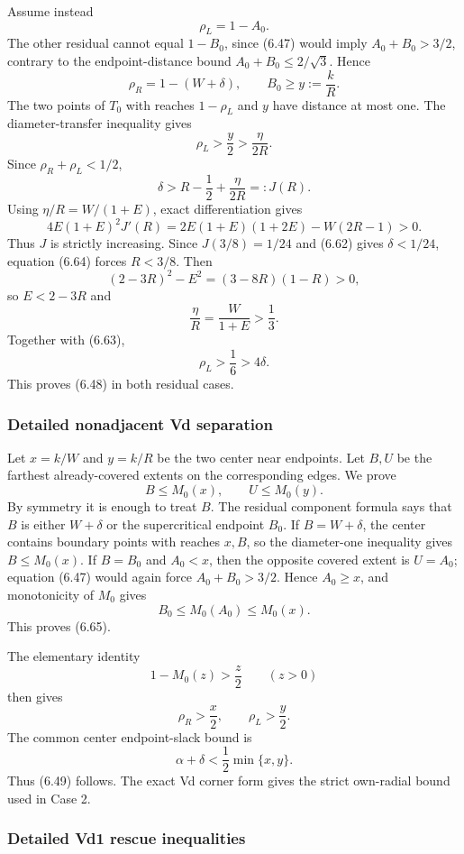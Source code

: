Assume instead
\[
 \rho_L=1-A_0.
\]
The other residual cannot equal $1-B_0$, since (6.47) would imply
$A_0+B_0>3/2$, contrary to the endpoint-distance bound
$A_0+B_0\le2/\sqrt3$.  Hence
\[
 \rho_R=1-(W+\delta),
 \qquad
 B_0\ge y:=\frac{k}{R}.
\]
The two points of $T_0$ with reaches $1-\rho_L$ and $y$ have distance at most
one.  The diameter-transfer inequality gives
\[
 \rho_L>\frac y2>\frac{\eta}{2R}.
 \tag{6.63}
\]
Since $\rho_R+\rho_L<1/2$,
\[
 \delta>R-\frac12+\frac{\eta}{2R}=:J(R).
 \tag{6.64}
\]
Using $\eta/R=W/(1+E)$, exact differentiation gives
\[
4E(1+E)^2J'(R)
=2E(1+E)(1+2E)-W(2R-1)>0.
\]
Thus $J$ is strictly increasing.  Since $J(3/8)=1/24$ and (6.62) gives
$\delta<1/24$, equation (6.64) forces $R<3/8$.  Then
\[
 (2-3R)^2-E^2=(3-8R)(1-R)>0,
\]
so $E<2-3R$ and
\[
 \frac{\eta}{R}=\frac{W}{1+E}>\frac13.
\]
Together with (6.63),
\[
 \rho_L>\frac16>4\delta.
\]
This proves (6.48) in both residual cases.

\subsubsection{Detailed nonadjacent Vd separation}
\label{subsec:calc-nonadjacent-vd}

Let $x=k/W$ and $y=k/R$ be the two center near endpoints.  Let $B,U$ be the
farthest already-covered extents on the corresponding edges.  We prove
\[
 B\le M_0(x),
 \qquad
 U\le M_0(y).
 \tag{6.65}
\]
By symmetry it is enough to treat $B$.  The residual component formula says
that $B$ is either $W+\delta$ or the supercritical endpoint $B_0$.
If $B=W+\delta$, the center contains boundary points with reaches $x,B$, so
the diameter-one inequality gives $B\le M_0(x)$.  If $B=B_0$ and
$A_0<x$, then the opposite covered extent is $U=A_0$; equation (6.47) would
again force $A_0+B_0>3/2$.  Hence $A_0\ge x$, and monotonicity of $M_0$
gives
\[
 B_0\le M_0(A_0)\le M_0(x).
\]
This proves (6.65).

The elementary identity
\[
 1-M_0(z)>\frac z2
 \qquad(z>0)
\]
then gives
\[
 \rho_R>\frac x2,
 \qquad
 \rho_L>\frac y2.
\]
The common center endpoint-slack bound is
\[
 \alpha+\delta<\frac12\min\{x,y\}.
\]
Thus (6.49) follows.  The exact Vd corner form gives the strict own-radial
bound used in Case 2.

\subsubsection{Detailed Vd1 rescue inequalities}
\label{subsec:calc-vd1-rescuer}

